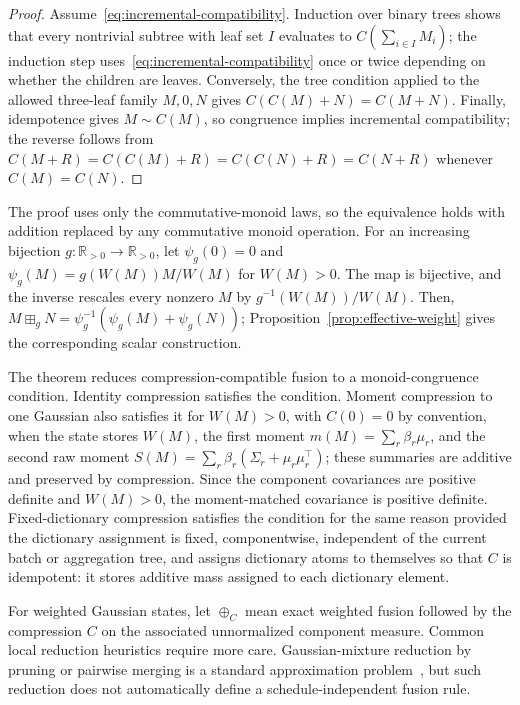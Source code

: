 \documentclass[runningheads]{llncs}
\newcommand{\R}{\mathbb{R}}
\begin{document}
\begin{proof}
Assume~\eqref{eq:incremental-compatibility}. Induction over binary trees shows that every nontrivial subtree with leaf set $I$ evaluates to $C(\sum_{i\in I}M_i)$; the induction step uses~\eqref{eq:incremental-compatibility} once or twice depending on whether the children are leaves. Conversely, the tree condition applied to the allowed three-leaf family $M,0,N$ gives $C(C(M)+N)=C(M+N)$. Finally, idempotence gives $M\sim C(M)$, so congruence implies incremental compatibility; the reverse follows from $C(M+R)=C(C(M)+R)=C(C(N)+R)=C(N+R)$ whenever $C(M)=C(N)$.
\end{proof}

The proof uses only the commutative-monoid laws, so the equivalence holds with addition replaced by any commutative monoid operation. For an increasing bijection $g:\R_{>0}\to\R_{>0}$, let $\psi_g(0)=0$ and $\psi_g(M)=g(W(M))M/W(M)$ for $W(M)>0$. The map is bijective, and the inverse rescales every nonzero $M$ by $g^{-1}(W(M))/W(M)$. Then, $M\boxplus_gN=\psi_g^{-1}(\psi_g(M)+\psi_g(N))$; Proposition~\ref{prop:effective-weight} gives the corresponding scalar construction.

The theorem reduces compression-compatible fusion to a monoid-congruence
condition. Identity compression satisfies the condition. Moment compression to one Gaussian also satisfies it for $W(M)>0$, with $C(0)=0$ by convention, when the state stores $W(M)$, the first moment $m(M)=\sum_r\beta_r\mu_r$, and the second raw moment $S(M)=\sum_r\beta_r(\Sigma_r+\mu_r\mu_r^\top)$; these summaries are additive and preserved by compression. Since the component covariances are positive definite and $W(M)>0$, the moment-matched covariance is positive definite. Fixed-dictionary compression satisfies the condition for the same reason provided the dictionary assignment is fixed, componentwise, independent of the current batch or aggregation tree, and assigns dictionary atoms to themselves so that $C$ is idempotent: it stores additive mass assigned to each dictionary element.

For weighted Gaussian states, let $\oplus_C$ mean exact weighted fusion followed by the compression $C$ on the associated unnormalized component measure. Common local reduction heuristics require more care. Gaussian-mixture reduction by pruning or pairwise merging is a standard approximation problem~\cite{runnalls2007kullback}, but such reduction does not automatically define a schedule-independent fusion rule. 
\end{document}
